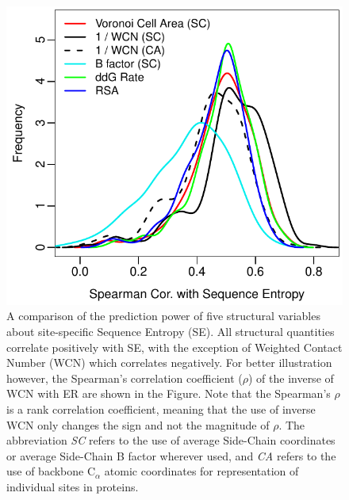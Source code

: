 \documentclass[11pt]{article}
\begin{document}
    \begin{figure}
        \begin{center}
        \includegraphics[width=5.5in]{best_structural_predictors_of_SE.pdf}
        \end{center}
        \caption{A comparison of the prediction power of five structural variables about site-specific Sequence Entropy (SE). All structural quantities correlate positively with SE, with the exception of Weighted Contact Number (WCN) which correlates negatively. For better illustration however, the Spearman's correlation coefficient ($\rho$) of the inverse of WCN with ER are shown in the Figure. Note that the Spearman's $\rho$ is a rank correlation coefficient, meaning that the use of inverse WCN only changes the sign and not the magnitude of $\rho$. The abbreviation {\it SC} refers to the use of average Side-Chain coordinates or average Side-Chain B factor wherever used, and {\it CA} refers to the use of backbone C$_\alpha$ atomic coordinates for representation of individual sites in proteins.}
        \label{fig:best_predictorSE}
    \end{figure}
\end{document}
